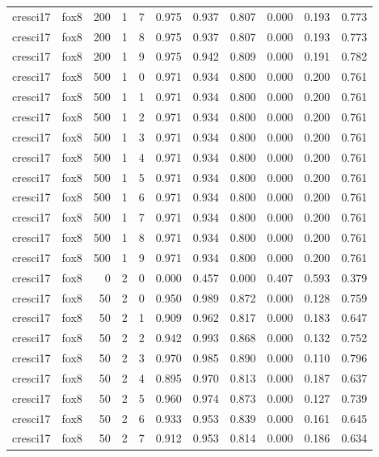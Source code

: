 \begin{tabular}{llrrrrrrrrr}
cresci17 & fox8 & 200 & 1 & 7 & 0.975 & 0.937 & 0.807 & 0.000 & 0.193 & 0.773 \\
cresci17 & fox8 & 200 & 1 & 8 & 0.975 & 0.937 & 0.807 & 0.000 & 0.193 & 0.773 \\
cresci17 & fox8 & 200 & 1 & 9 & 0.975 & 0.942 & 0.809 & 0.000 & 0.191 & 0.782 \\
cresci17 & fox8 & 500 & 1 & 0 & 0.971 & 0.934 & 0.800 & 0.000 & 0.200 & 0.761 \\
cresci17 & fox8 & 500 & 1 & 1 & 0.971 & 0.934 & 0.800 & 0.000 & 0.200 & 0.761 \\
cresci17 & fox8 & 500 & 1 & 2 & 0.971 & 0.934 & 0.800 & 0.000 & 0.200 & 0.761 \\
cresci17 & fox8 & 500 & 1 & 3 & 0.971 & 0.934 & 0.800 & 0.000 & 0.200 & 0.761 \\
cresci17 & fox8 & 500 & 1 & 4 & 0.971 & 0.934 & 0.800 & 0.000 & 0.200 & 0.761 \\
cresci17 & fox8 & 500 & 1 & 5 & 0.971 & 0.934 & 0.800 & 0.000 & 0.200 & 0.761 \\
cresci17 & fox8 & 500 & 1 & 6 & 0.971 & 0.934 & 0.800 & 0.000 & 0.200 & 0.761 \\
cresci17 & fox8 & 500 & 1 & 7 & 0.971 & 0.934 & 0.800 & 0.000 & 0.200 & 0.761 \\
cresci17 & fox8 & 500 & 1 & 8 & 0.971 & 0.934 & 0.800 & 0.000 & 0.200 & 0.761 \\
cresci17 & fox8 & 500 & 1 & 9 & 0.971 & 0.934 & 0.800 & 0.000 & 0.200 & 0.761 \\
cresci17 & fox8 & 0 & 2 & 0 & 0.000 & 0.457 & 0.000 & 0.407 & 0.593 & 0.379 \\
cresci17 & fox8 & 50 & 2 & 0 & 0.950 & 0.989 & 0.872 & 0.000 & 0.128 & 0.759 \\
cresci17 & fox8 & 50 & 2 & 1 & 0.909 & 0.962 & 0.817 & 0.000 & 0.183 & 0.647 \\
cresci17 & fox8 & 50 & 2 & 2 & 0.942 & 0.993 & 0.868 & 0.000 & 0.132 & 0.752 \\
cresci17 & fox8 & 50 & 2 & 3 & 0.970 & 0.985 & 0.890 & 0.000 & 0.110 & 0.796 \\
cresci17 & fox8 & 50 & 2 & 4 & 0.895 & 0.970 & 0.813 & 0.000 & 0.187 & 0.637 \\
cresci17 & fox8 & 50 & 2 & 5 & 0.960 & 0.974 & 0.873 & 0.000 & 0.127 & 0.739 \\
cresci17 & fox8 & 50 & 2 & 6 & 0.933 & 0.953 & 0.839 & 0.000 & 0.161 & 0.645 \\
cresci17 & fox8 & 50 & 2 & 7 & 0.912 & 0.953 & 0.814 & 0.000 & 0.186 & 0.634 \\

\end{tabular}
